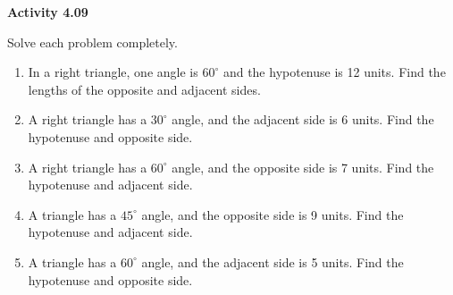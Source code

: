 \vspace{0.3ex}
\noindent\textbf{Activity 4.09}

\vspace{0.2ex}

Solve each problem completely.

\begin{enumerate}
    \item In a right triangle, one angle is \(60^\circ\) and the hypotenuse is 12 units. Find the lengths of the opposite and adjacent sides.
    \item A right triangle has a \(30^\circ\) angle, and the adjacent side is 6 units. Find the hypotenuse and opposite side.
    \item A right triangle has a \(60^\circ\) angle, and the opposite side is 7 units. Find the hypotenuse and adjacent side.
    \item A triangle has a \(45^\circ\) angle, and the opposite side is 9 units. Find the hypotenuse and adjacent side.
    \item A triangle has a \(60^\circ\) angle, and the adjacent side is 5 units. Find the hypotenuse and opposite side.
\end{enumerate}
